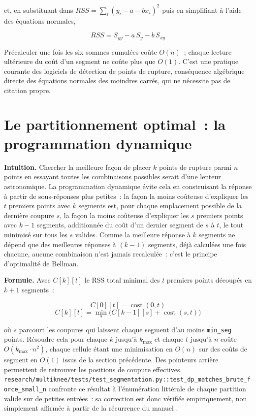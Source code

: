 \documentclass[11pt]{article}
\newcommand{\code}[1]{\texttt{#1}}
\begin{document}
et, en substituant dans $RSS = \sum_i (y_i - a - b x_i)^2$ puis en
simplifiant à l'aide des équations normales,

\begin{equation}
RSS = S_{yy} - a\,S_y - b\,S_{xy}
\end{equation}

Précalculer une fois les six sommes cumulées coûte $O(n)$~; chaque lecture
ultérieure du coût d'un segment ne coûte plus que $O(1)$. C'est une
pratique courante des logiciels de détection de points de rupture,
conséquence algébrique directe des équations normales des moindres carrés,
qui ne nécessite pas de citation propre.

\section{Le partitionnement optimal~: la programmation dynamique}
\label{sec:pd}

\textbf{Intuition.} Chercher la meilleure façon de placer $k$ points de
rupture parmi $n$ points en essayant toutes les combinaisons possibles
serait d'une lenteur astronomique. La programmation dynamique évite cela en
construisant la réponse à partir de sous-réponses plus petites~: la façon
la moins coûteuse d'expliquer les $t$ premiers points avec $k$ segments
est, pour chaque emplacement possible de la dernière coupure $s$, la façon
la moins coûteuse d'expliquer les $s$ premiers points avec $k-1$ segments,
additionnée du coût d'un dernier segment de $s$ à $t$, le tout minimisé sur
tous les $s$ valides. Comme la meilleure réponse à $k$ segments ne dépend
que des meilleures réponses à $(k-1)$ segments, déjà calculées une fois
chacune, aucune combinaison n'est jamais recalculée~: c'est le principe
d'optimalité de Bellman.

\textbf{Formule.} Avec $C[k][t]$ le RSS total minimal des $t$ premiers
points découpés en $k+1$ segments~:

\begin{equation}
C[0][t] = \operatorname{cost}(0, t)
\end{equation}
\begin{equation}
C[k][t] = \min_{s} \Big( C[k-1][s] + \operatorname{cost}(s, t) \Big)
\end{equation}

où $s$ parcourt les coupures qui laissent chaque segment d'au moins
\code{min\_seg} points. Résoudre cela pour chaque $k$ jusqu'à $k_{\max}$ et
chaque $t$ jusqu'à $n$ coûte $O(k_{\max} \cdot n^2)$, chaque cellule étant
une minimisation en $O(n)$ sur des coûts de segment en $O(1)$ issus de la
section précédente. Des pointeurs arrière permettent de retrouver les
positions de coupure effectives.
\code{research/multiknee/tests/test\_segmentation.py::test\_dp\_matches\_brute\_force\_small\_n}
confronte ce résultat à l'énumération littérale de chaque partition valide
sur de petites entrées~: sa correction est donc vérifiée empiriquement, non
simplement affirmée à partir de la récurrence du manuel
\citep{cormen2022algorithms,dasgupta2006algorithms}.
\end{document}
